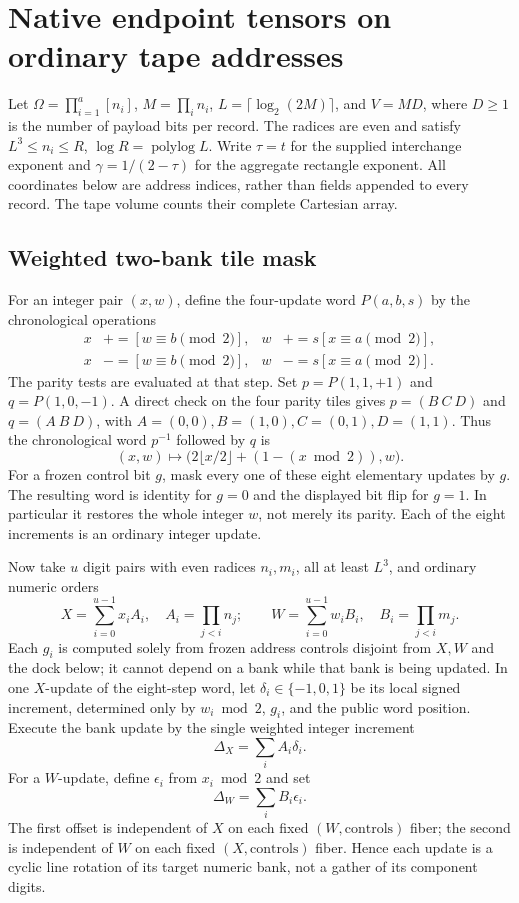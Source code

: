 \section{Native endpoint tensors on ordinary tape addresses}
\label{app:native-endpoint}
Let $\Omega=\prod_{i=1}^{a}[n_i]$, $M=\prod_i n_i$,
$L=\lceil\log_2(2M)\rceil$, and $V=MD$, where $D\ge1$ is the
number of payload bits per record. The radices are even and satisfy
$L^3\le n_i\le R$, $\log R=\operatorname{polylog}L$.
Write $\tau=t$ for the supplied interchange exponent and
$\gamma=1/(2-\tau)$ for the aggregate rectangle exponent.
All coordinates below are address indices, rather than fields appended
to every record. The tape volume counts their complete Cartesian array.
\subsection{Weighted two-bank tile mask}
\label{sec:weighted-native-mask}

For an integer pair $(x,w)$, define the four-update word $P(a,b,s)$ by
the chronological operations
\[
\begin{aligned}
 x&\mathrel{+}= [w\equiv b\pmod2], &
 w&\mathrel{+}=s[x\equiv a\pmod2],\\
 x&\mathrel{-}= [w\equiv b\pmod2], &
 w&\mathrel{-}=s[x\equiv a\pmod2].
\end{aligned}
\]
The parity tests are evaluated at that step.  Set
$p=P(1,1,+1)$ and $q=P(1,0,-1)$.  A direct check on the four parity
tiles gives $p=(B\ C\ D)$ and $q=(A\ B\ D)$, with
$A=(0,0),B=(1,0),C=(0,1),D=(1,1)$.  Thus the chronological word
$p^{-1}$ followed by $q$ is
\[
 (x,w)\longmapsto
 \bigl(2\lfloor x/2\rfloor+(1-(x\bmod2)),w\bigr).
\]
For a frozen control bit $g$, mask every one of these eight elementary
updates by $g$.  The resulting word is identity for $g=0$ and the displayed
bit flip for $g=1$.  In particular it restores the whole integer $w$,
not merely its parity.  Each of the eight increments is an ordinary integer update.

Now take $u$ digit pairs with even radices $n_i,m_i$, all at least $L^3$,
and ordinary numeric orders
\[
 X=\sum_{i=0}^{u-1}x_iA_i,\quad A_i=\prod_{j<i}n_j;
 \qquad
 W=\sum_{i=0}^{u-1}w_iB_i,\quad B_i=\prod_{j<i}m_j.
\]
Each $g_i$ is computed solely from frozen address controls disjoint from
$X,W$ and the dock below; it cannot depend on a bank while that bank is
being updated.  In one $X$-update of the eight-step word, let
$\delta_i\in\{-1,0,1\}$ be its local signed increment, determined only
by $w_i\bmod2$, $g_i$, and the public word position.  Execute the bank
update by the single weighted integer increment
\[
                 \Delta_X=\sum_i A_i\delta_i.
\]
For a $W$-update, define $\epsilon_i$ from $x_i\bmod2$ and set
\[
                 \Delta_W=\sum_i B_i\epsilon_i.
\]
The first offset is independent of $X$ on each fixed $(W,\text{controls})$
fiber; the second is independent of $W$ on each fixed
$(X,\text{controls})$ fiber.  Hence each update is a cyclic line rotation
of its target numeric bank, not a gather of its component digits.

